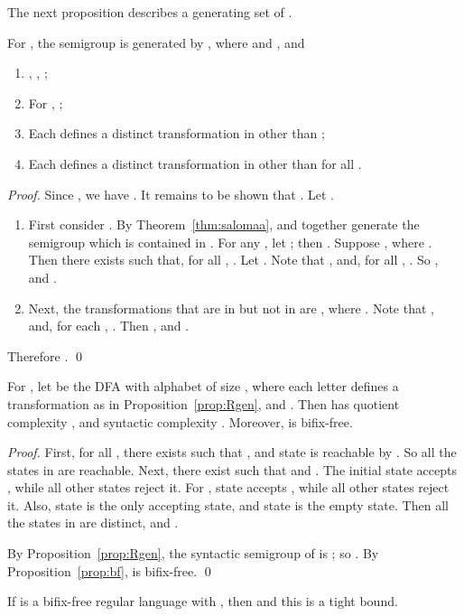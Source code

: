 \documentclass{llncs}
\newcommand{\be}{\begin{enumerate}}
\newcommand{\ee}{\end{enumerate}}
\begin{document}
The next proposition describes a generating set of . 
\begin{proposition}\label{prop:Rgen} 
For , the semigroup  is generated by , where  and , and 
\be
\item , , ; 
\item For , ; 
\item Each  defines a distinct transformation in  other than ; 
\item Each  defines a distinct transformation in  other than  for all . 
\ee
\end{proposition}

\begin{proof} 
Since , we have . It remains to be shown that . Let . 
\be 
\item First consider . By Theorem~\ref{thm:salomaa},  and  together generate the semigroup  which is contained in . For any , let ; then . Suppose , where . Then there exists  such that, for all , . Let . Note that , and, for all , . So , and . 

\item Next, the transformations that are in  but not in  are , where . Note that , and, for each , . Then , and . 
\ee 

Therefore . \qed
\end{proof}


\begin{theorem}\label{thm:bfaut1} 
For , let  be the DFA with alphabet  of size , where each letter defines a transformation as in Proposition~\ref{prop:Rgen}, and . Then  has quotient complexity , and syntactic complexity . Moreover,  is bifix-free. 
\end{theorem}


\begin{proof} 
First, for all , there exists  such that , and state  is reachable by . So all the states in  are reachable. Next, there exist  such that  and . The initial state accepts , while all other states reject it. For , state  accepts , while all other states reject it. Also, state  is the only accepting state, and state  is the empty state. Then all the states in  are distinct, and . 

By Proposition~\ref{prop:Rgen}, the syntactic semigroup of  is ; so . By Proposition~\ref{prop:bf},  is bifix-free. \qed
\end{proof}


\smallskip

\begin{conjecture}
\label{con:bf}
If  is a bifix-free regular language with , then  and this is a tight bound. 
\end{conjecture}
\end{document}
